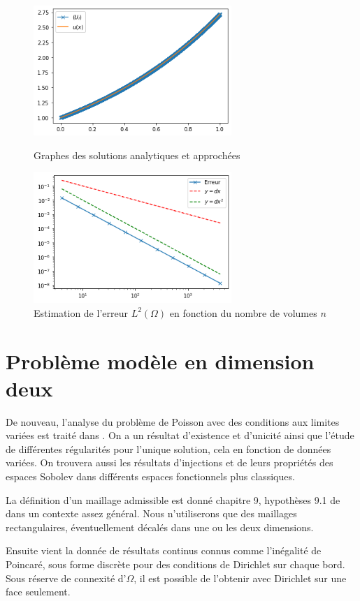 \begin{figure}[htp]
    \centering
    \includegraphics[width=7.5cm]{Images/preliminaires/Laplace Dirichlet 1D/solution.png}
    \caption{Graphes des solutions analytiques et approchées}
    \includegraphics[width=7.5cm]{Images/preliminaires/Laplace Dirichlet 1D/analyse.png}
    \caption{Estimation de l'erreur $L^2(\Omega)$ en fonction du nombre de volumes $n$}
\end{figure}

\newpage

\section{Problème modèle en dimension deux}

De nouveau, l'analyse du problème de Poisson avec des conditions aux limites variées est traité dans \cite{brezis1983}. On a un résultat d'existence et d'unicité ainsi que l'étude de différentes régularités pour l'unique solution, cela en fonction de données variées. On trouvera aussi les résultats d'injections et de leurs propriétés des espaces Sobolev dans différents espaces fonctionnels plus classiques.

La définition d'un maillage admissible est donné chapitre 9, hypothèses 9.1 de \cite{eymard:hal-02100732} dans un contexte assez général. Nous n'utiliserons que des maillages rectangulaires, éventuellement décalés dans une ou les deux dimensions.

Ensuite vient la donnée de résultats continus connus comme l'inégalité de Poincaré, sous forme discrète pour des conditions de Dirichlet sur chaque bord. Sous réserve de connexité d'$\Omega$, il est possible de l'obtenir avec Dirichlet sur une face seulement.

